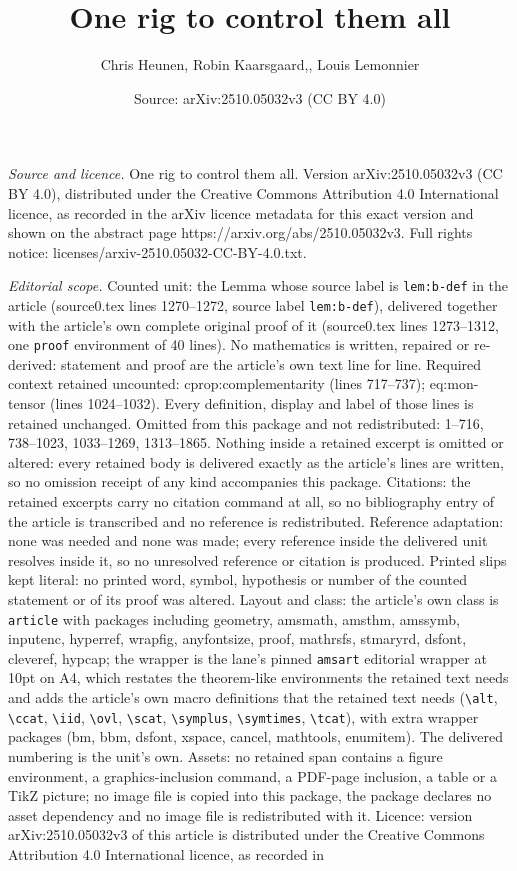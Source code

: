 \documentclass[10pt,a4paper]{amsart}
\title[One rig to control them all]{One rig to control them all}
\author{Chris Heunen, Robin Kaarsgaard,, Louis Lemonnier}
\date{Source: arXiv:2510.05032v3 (CC BY 4.0)}
\begin{document}
\maketitle

\noindent\emph{Source and licence.} One rig to control them all. Version arXiv:2510.05032v3 (CC BY 4.0), distributed under the Creative Commons Attribution 4.0 International licence, as recorded in the arXiv licence metadata for this exact version and shown on the abstract page https://arxiv.org/abs/2510.05032v3. Full rights notice: licenses/arxiv-2510.05032-CC-BY-4.0.txt.\par\smallskip

\noindent\textit{Editorial scope.} Counted unit: the Lemma whose source label is \texttt{lem:b-def} in the article (source0.tex lines 1270--1272, source label \texttt{lem:b-def}), delivered together with the article's own complete original proof of it (source0.tex lines 1273--1312, one \texttt{proof} environment of 40 lines). No mathematics is written, repaired or re-derived: statement and proof are the article's own text line for line. Required context retained uncounted: cprop:complementarity (lines 717--737); eq:mon-tensor (lines 1024--1032). Every definition, display and label of those lines is retained unchanged. Omitted from this package and not redistributed: 1--716, 738--1023, 1033--1269, 1313--1865. Nothing inside a retained excerpt is omitted or altered: every retained body is delivered exactly as the article's lines are written, so no omission receipt of any kind accompanies this package. Citations: the retained excerpts carry no citation command at all, so no bibliography entry of the article is transcribed and no reference is redistributed. Reference adaptation: none was needed and none was made; every reference inside the delivered unit resolves inside it, so no unresolved reference or citation is produced. Printed slips kept literal: no printed word, symbol, hypothesis or number of the counted statement or of its proof was altered. Layout and class: the article's own class is \texttt{article} with packages including geometry, amsmath, amsthm, amssymb, inputenc, hyperref, wrapfig, anyfontsize, proof, mathrsfs, stmaryrd, dsfont, cleveref, hypcap; the wrapper is the lane's pinned \texttt{amsart} editorial wrapper at 10pt on A4, which restates the theorem-like environments the retained text needs and adds the article's own macro definitions that the retained text needs (\texttt{\textbackslash alt}, \texttt{\textbackslash ccat}, \texttt{\textbackslash iid}, \texttt{\textbackslash ovl}, \texttt{\textbackslash scat}, \texttt{\textbackslash symplus}, \texttt{\textbackslash symtimes}, \texttt{\textbackslash tcat}), with extra wrapper packages (bm, bbm, dsfont, xspace, cancel, mathtools, enumitem). The delivered numbering is the unit's own. Assets: no retained span contains a figure environment, a graphics-inclusion command, a PDF-page inclusion, a table or a TikZ picture; no image file is copied into this package, the package declares no asset dependency and no image file is redistributed with it. Licence: version arXiv:2510.05032v3 of this article is distributed under the Creative Commons Attribution 4.0 International licence, as recorded in 
\end{document}
